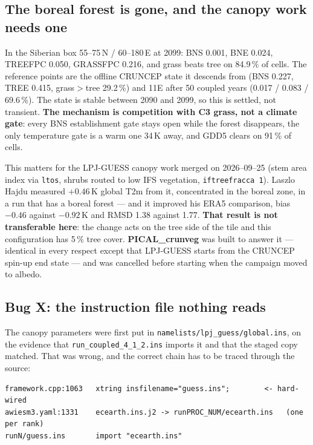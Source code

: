 \documentclass[10pt]{article}
\begin{document}
\subsection{The boreal forest is gone, and the canopy work needs one}\label{sub:r40boreal}

In the Siberian box 55--75\,N / 60--180\,E at 2099: BNS 0.001, BNE 0.024, TREEFPC 0.050,
GRASSFPC 0.216, and grass beats tree on 84.9\,\% of cells. The reference points are the offline
CRUNCEP state it descends from (BNS 0.227, TREE 0.415, grass$>$tree 29.2\,\%) and 11E after 50
coupled years (0.017 / 0.083 / 69.6\,\%). The state is stable between 2090 and 2099, so this is
settled, not transient. \textbf{The mechanism is competition with C3 grass, not a climate
gate}: every BNS establishment gate stays open while the forest disappears, the only
temperature gate is a warm one 34\,K away, and GDD5 clears on 91\,\% of cells.

This matters for the LPJ-GUESS canopy work merged on 2026--09--25 (stem area index via
\texttt{ltos}, shrubs routed to low IFS vegetation, \texttt{iftreefracca 1}). Laszlo Hajdu
measured $+0.46$\,K global T2m from it, concentrated in the boreal zone, in a run that has a
boreal forest --- and it improved his ERA5 comparison, bias $-0.46$ against $-0.92$\,K and RMSD
1.38 against 1.77. \textbf{That result is not transferable here}: the change acts on the tree
side of the tile and this configuration has 5\,\% tree cover. \textbf{PICAL\_crunveg} was built
to answer it --- identical in every respect except that LPJ-GUESS starts from the CRUNCEP
spin-up end state --- and was cancelled before starting when the campaign moved to albedo.

\subsection{Bug X: the instruction file nothing reads}\label{sub:r40insfile}

The canopy parameters were first put in \texttt{namelists/lpj\_guess/global.ins}, on the
evidence that \texttt{run\_coupled\_4\_1\_2.ins} imports it and that the staged copy matched.
That was wrong, and the correct chain has to be traced through the source:

\begin{verbatim}
framework.cpp:1063   xtring insfilename="guess.ins";        <- hard-wired
awiesm3.yaml:1331    ecearth.ins.j2 -> runPROC_NUM/ecearth.ins   (one per rank)
runN/guess.ins       import "ecearth.ins"
\end{verbatim}
\end{document}

